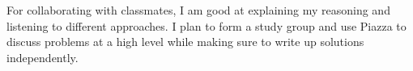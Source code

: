 \documentclass[12pt]{exam}
\begin{document}
\begin{solution}
\begin{qparts}
    \item For collaborating with classmates, I am good at explaining my reasoning and listening to different approaches. I plan to form a study group and use Piazza to discuss problems at a high level while making sure to write up solutions independently.
\end{qparts}
\end{solution}
\end{document}
